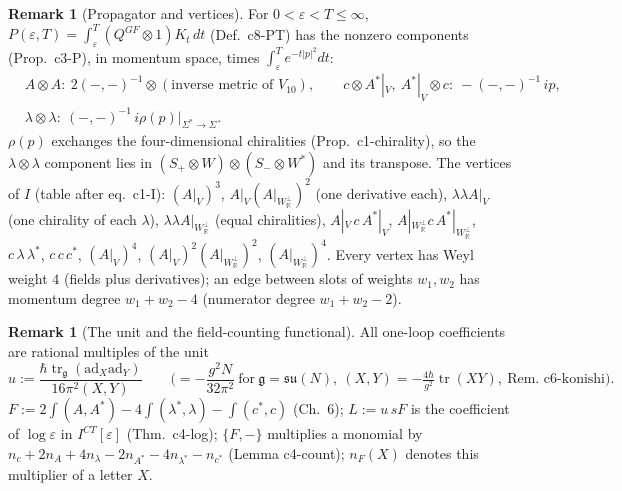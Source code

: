 \documentclass[11pt]{article}
\numberwithin{equation}{section}
\theoremstyle{plain}
\theoremstyle{definition}
\newtheorem{remark}[theorem]{Remark}
\begin{document}
\begin{remark}[Propagator and vertices]
\label{rem:tl-P}
For $0<\varepsilon<T\le\infty$, $P(\varepsilon,T)=\int_\varepsilon^T(Q^{GF}\otimes1)K_t\,dt$ (Def.~c8-PT) has the nonzero components (Prop.~c3-P), in momentum space, times $\int_\varepsilon^Te^{-t|p|^2}dt$:
\[
\begin{aligned}&A\otimes A:\ 2(-,-)^{-1}\otimes(\text{inverse metric of }V_{10}),\qquad c\otimes A^*|_V,\ A^*|_V\otimes c:\ -(-,-)^{-1}\,ip,\\ &\lambda\otimes\lambda:\ (-,-)^{-1}\,i\rho(p)|_{\Sigma^*\to\Sigma}.\end{aligned}
\]
$\rho(p)$ exchanges the four-dimensional chiralities (Prop.~c1-chirality), so the $\lambda\otimes\lambda$ component lies in $(S_+\otimes W)\otimes(S_-\otimes W^*)$ and its transpose. The vertices of $I$ (table after eq.~c1-I): $(A|_V)^3$, $A|_V(A|_{W_{\mathbb R}^\perp})^2$ (one derivative each), $\lambda\lambda A|_V$ (one chirality of each $\lambda$), $\lambda\lambda A|_{W_{\mathbb R}^\perp}$ (equal chiralities), $A|_V\,c\,A^*|_V$, $A|_{W_{\mathbb R}^\perp}c\,A^*|_{W_{\mathbb R}^\perp}$, $c\,\lambda\,\lambda^*$, $c\,c\,c^*$, $(A|_V)^4$, $(A|_V)^2(A|_{W_{\mathbb R}^\perp})^2$, $(A|_{W_{\mathbb R}^\perp})^4$. Every vertex has Weyl weight $4$ (fields plus derivatives); an edge between slots of weights $w_1,w_2$ has momentum degree $w_1+w_2-4$ (numerator degree $w_1+w_2-2$).
\end{remark}

\begin{remark}[The unit and the field-counting functional]
\label{rem:tl-unit}
All one-loop coefficients are rational multiples of the unit
\[
u:=\frac{\hbar\operatorname{tr}_{\mathfrak g}(\mathrm{ad}_X\mathrm{ad}_Y)}{16\pi^2(X,Y)}\qquad\Big(=-\frac{g^2N}{32\pi^2}\ \text{for}\ \mathfrak g=\mathfrak{su}(N),\ (X,Y)=-\tfrac{4\hbar}{g^2}\operatorname{tr}(XY),\ \text{Rem.~c6-konishi}\Big).
\]
$F:=2\int(A,A^*)-4\int(\lambda^*,\lambda)-\int(c^*,c)$ (Ch.~6); $L:=u\,sF$ is the coefficient of $\log\varepsilon$ in $I^{CT}[\varepsilon]$ (Thm.~c4-log); $\{F,-\}$ multiplies a monomial by $n_c+2n_A+4n_\lambda-2n_{A^*}-4n_{\lambda^*}-n_{c^*}$ (Lemma c4-count); $n_F(X)$ denotes this multiplier of a letter $X$.
\end{remark}
\end{document}
